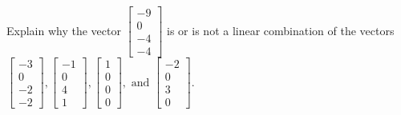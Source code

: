 \documentclass{article}
\begin{document}
\begin{exerciseStatement}
    Explain why the vector \(\left[\begin{array}{c}
-9 \\
0 \\
-4 \\
-4
\end{array}\right]\)  is or is not a linear
combination of the vectors \(\left[\begin{array}{c}
-3 \\
0 \\
-2 \\
-2
\end{array}\right] , \left[\begin{array}{c}
-1 \\
0 \\
4 \\
1
\end{array}\right] , \left[\begin{array}{c}
1 \\
0 \\
0 \\
0
\end{array}\right] , \text{ and } \left[\begin{array}{c}
-2 \\
0 \\
3 \\
0
\end{array}\right]\).



  
\end{exerciseStatement}
\end{document}

